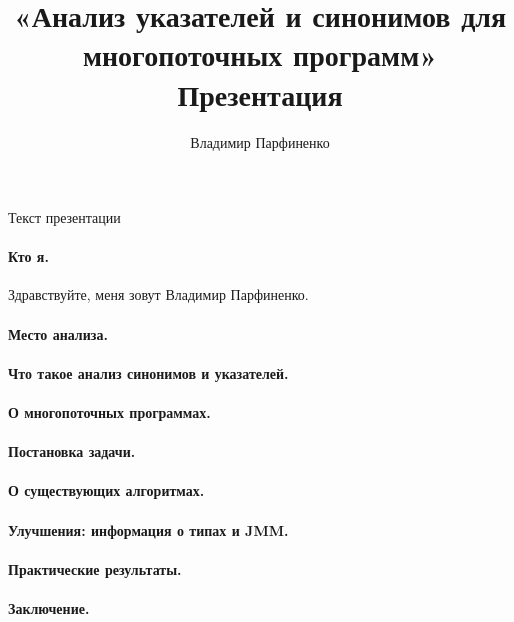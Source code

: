 \documentclass[12pt]{article}
\title{
  «Анализ указателей и синонимов для многопоточных программ»\\
  Презентация
}
\author{
  Владимир Парфиненко
}
\begin{document}
  {\Large Текст презентации}
  \vspace{5mm}

  \paragraph{Кто я.}
  Здравствуйте, меня зовут Владимир Парфиненко.

  \paragraph{Место анализа.}

  \paragraph{Что такое анализ синонимов и указателей.}

  \paragraph{О многопоточных программах.}

  \paragraph{Постановка задачи.}

  \paragraph{О существующих алгоритмах.}

  \paragraph{Улучшения: информация о типах и JMM.}

  \paragraph{Практические результаты.}

  \paragraph{Заключение.}
\end{document}
